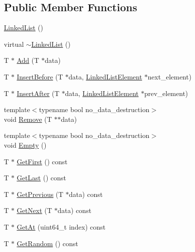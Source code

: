 \subsection*{Public Member Functions}
\begin{DoxyCompactItemize}
\item 
\hyperlink{classmage_1_1_linked_list_a44b43c51b9515695016c8664d898aa6b}{Linked\+List} ()
\item 
virtual \hyperlink{classmage_1_1_linked_list_a88cb2ec52e90f3658d9735b4948cccdb}{$\sim$\+Linked\+List} ()
\item 
T $\ast$ \hyperlink{classmage_1_1_linked_list_ac6cd236aab89f296d3c112c05b2337e2}{Add} (T $\ast$data)
\item 
T $\ast$ \hyperlink{classmage_1_1_linked_list_a5744f0c1ae3b9e752dffdd3fdb518f5c}{Insert\+Before} (T $\ast$data, \hyperlink{structmage_1_1_linked_list_1_1_linked_list_element}{Linked\+List\+Element} $\ast$next\+\_\+element)
\item 
T $\ast$ \hyperlink{classmage_1_1_linked_list_a25424001f549e03d785a219d99231044}{Insert\+After} (T $\ast$data, \hyperlink{structmage_1_1_linked_list_1_1_linked_list_element}{Linked\+List\+Element} $\ast$prev\+\_\+element)
\item 
{\footnotesize template$<$typename bool no\+\_\+data\+\_\+destruction$>$ }\\void \hyperlink{classmage_1_1_linked_list_a37af908f76d8e21f7591104ed85226df}{Remove} (T $\ast$$\ast$data)
\item 
{\footnotesize template$<$typename bool no\+\_\+data\+\_\+destruction$>$ }\\void \hyperlink{classmage_1_1_linked_list_a6f57c11ad87c0f6d8f6ae8e785431c39}{Empty} ()
\item 
T $\ast$ \hyperlink{classmage_1_1_linked_list_a8394fd1c390b806b9daafdff497b02fb}{Get\+First} () const
\item 
T $\ast$ \hyperlink{classmage_1_1_linked_list_a734f6dc6d073edd99eb9a0ac1f605900}{Get\+Last} () const
\item 
T $\ast$ \hyperlink{classmage_1_1_linked_list_a48a61ad79c7a7f4d460d56867ce62cf4}{Get\+Previous} (T $\ast$data) const
\item 
T $\ast$ \hyperlink{classmage_1_1_linked_list_a992390dbc48cf24705f9e79baef37061}{Get\+Next} (T $\ast$data) const
\item 
T $\ast$ \hyperlink{classmage_1_1_linked_list_a97922b200a12979e5c8692dd5f3f73d1}{Get\+At} (uint64\+\_\+t index) const
\item 
T $\ast$ \hyperlink{classmage_1_1_linked_list_aec571022e5fa10e0afea286e4427eb89}{Get\+Random} () const
$$
\end{DoxyCompactItemize}

